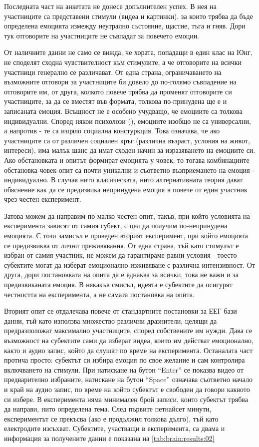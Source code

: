 \documentclass[main.tex]{subfiles}
\begin{document}
Последната част на анкетата не донесе допълнителен успех. В нея на участниците са представени стимули (видеа и картинки), за които трябва да бъде определена емоцията измежду неутрално състояние, щастие, тъга и гняв. Дори тук отговорите на участниците не съвпадат за повечето емоции.

От наличните данни не само се вижда, че хората, попадащи в един клас на Юнг, не споделят сходна чувствителност към стимулите, а че отговорите на всички участници генерално се различават. От една страна, ограничаването на възможните отговори за участниците би довело до по-голямо съвпадение на отговорите им, от друга, колкото повече трябва да променят отговорите си участниците, за да се вместят във формата, толкова по-принудена ще е и записаната емоция. Всъщност не е особено учудващо, че емоциите са толкова индивидуални. Според някои психолози (\cite{stupid-book}), емоциите изобщо не са универсални, а напротив - те са изцяло социална констуркция. Това означава, че ако участниците са от различен социален кръг (различна възраст, условия на живот, интереси), има малък шанс да имат сходен начин за изразяването на емоциите си. Ако обстановката и опитът формират емоцията у човек, то тогава комбинациите обстановка-човек-опит са почти уникални и съответно възприемането на емоция - индивидуално. В случая нито класическата, нито алтернативната теория дават обяснение как да се предизвика непринудена емоция в повече от един участник чрез честен експеримент.

Затова можем да направим по-малко честен опит, такъв, при който условията на експеримента зависят от самия субект, с цел да получим по-непринудена емоцията. С този замисъл е проведен вторият експеримент, при който емоцията се предизвиква от лични преживявания. От една страна, тъй като стимулът е избран от самия участник, не можем да гарантираме равни условия - тоесто субектите могат да изберат емоционално изживяване с различна интензивност. От друга, дори постановката на опита да е еднаква за всички, това не важи и за предизвиканата емоция. В някакъв смисъл, идеята е субектите да осигурят честността на експеримента, а не самата постановка на опита.

Вторият опит се отдалечава повече от стандартните постановки за ЕЕГ бази данни, тъй като използва множество различни дразнители, целящи да предразположат максимално участниците, според собствените им нужди. Дава се възможност на субектите сами да изберат видеа, които им действат емоционално, както и аудио запис, който да слушат по време на експеримента. Останалата част протича просто: субектът си избира емоция по свое желание и сам контролира включването на стимули. При натискане на бутон ``Enter'' се показва видео от предварително избраните, натискане на бутон ``Space'' означава съответно начало и край на аудио запис, по време на който субектът е свободен да говори каквото си избере. В експеримента няма минимален брой записи, които субектът трябва да направи, нито определена тема. След първите петнайсет минути, експериментът се прекъсва (ако е продължил толкова дълго), тъй като електродите изсъхват. Субектите, участващи в експеримента, са двама и информация за получените данни е показана на \autoref{tab:brain:results:02}
\end{document}
